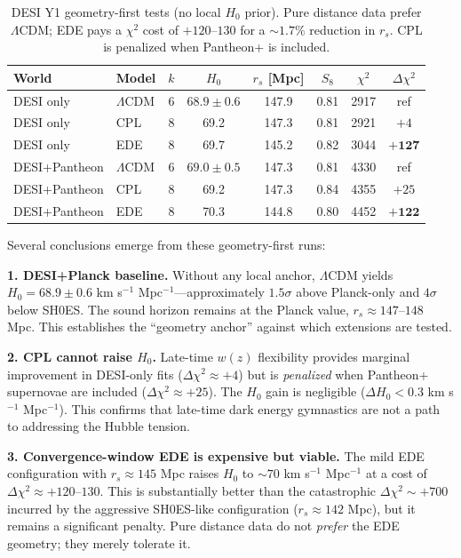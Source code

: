 \documentclass[a4paper,11pt]{article}
\begin{document}
\begin{table}[ht]
\centering
\caption{DESI Y1 geometry-first tests (no local $H_0$ prior). Pure distance data prefer $\Lambda$CDM; EDE pays a $\chi^2$ cost of $+120$--$130$ for a $\sim 1.7\%$ reduction in $r_s$. CPL is penalized when Pantheon+ is included.}
\label{tab:desi_geometry}
\begin{tabular}{llcccccc}
\hline
World & Model & $k$ & $H_0$ & $r_s$ [Mpc] & $S_8$ & $\chi^2$ & $\Delta\chi^2$ \\
\hline
DESI only & $\Lambda$CDM & 6 & $68.9 \pm 0.6$ & 147.9 & 0.81 & 2917 & ref \\
DESI only & CPL & 8 & 69.2 & 147.3 & 0.81 & 2921 & $+4$ \\
DESI only & EDE & 8 & 69.7 & 145.2 & 0.82 & 3044 & $\mathbf{+127}$ \\
\hline
DESI+Pantheon & $\Lambda$CDM & 6 & $69.0 \pm 0.5$ & 147.3 & 0.81 & 4330 & ref \\
DESI+Pantheon & CPL & 8 & 69.2 & 147.3 & 0.84 & 4355 & $+25$ \\
DESI+Pantheon & EDE & 8 & 70.3 & 144.8 & 0.80 & 4452 & $\mathbf{+122}$ \\
\hline
\end{tabular}
\end{table}

Several conclusions emerge from these geometry-first runs:

\textbf{1. DESI+Planck baseline.} Without any local anchor, $\Lambda$CDM yields $H_0 = 68.9 \pm 0.6$ km s$^{-1}$ Mpc$^{-1}$---approximately $1.5\sigma$ above Planck-only and $4\sigma$ below SH0ES. The sound horizon remains at the Planck value, $r_s \approx 147$--$148$ Mpc. This establishes the ``geometry anchor'' against which extensions are tested.

\textbf{2. CPL cannot raise $H_0$.} Late-time $w(z)$ flexibility provides marginal improvement in DESI-only fits ($\Delta\chi^2 \approx +4$) but is \emph{penalized} when Pantheon+ supernovae are included ($\Delta\chi^2 \approx +25$). The $H_0$ gain is negligible ($\Delta H_0 < 0.3$ km s$^{-1}$ Mpc$^{-1}$). This confirms that late-time dark energy gymnastics are not a path to addressing the Hubble tension.

\textbf{3. Convergence-window EDE is expensive but viable.} The mild EDE configuration with $r_s \approx 145$ Mpc raises $H_0$ to $\sim 70$ km s$^{-1}$ Mpc$^{-1}$ at a cost of $\Delta\chi^2 \approx +120$--$130$. This is substantially better than the catastrophic $\Delta\chi^2 \sim +700$ incurred by the aggressive SH0ES-like configuration ($r_s \approx 142$ Mpc), but it remains a significant penalty. Pure distance data do not \emph{prefer} the EDE geometry; they merely tolerate it.
\end{document}
